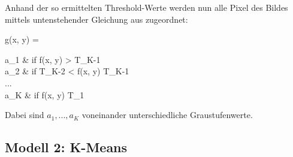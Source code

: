 			Anhand der so ermittelten Threshold-Werte werden nun alle Pixel des Bildes mittels untenstehender Gleichung aus \cite[S. 739]{gonzalez-woods} zugeordnet:
			\begin{flalign}
				\centering
				g(x, y) = 
				\begin{cases}
					a_{1} & \textrm{if } f(x, y) > T_{K-1}\\
					a_{2} & \textrm{if } T_{K-2} < f(x, y) \leq T_{K-1}\\
					... \\
					a_{K} & \textrm{if } f(x, y) \leq T_{1}
				\end{cases}
				\label{eq:threshold}
			\end{flalign}
			Dabei sind $a_{1}, ..., a_{K}$ voneinander unterschiedliche Graustufenwerte.
	
		\subsection{Modell 2: K-Means}
		\label{sub:meth2}
		
